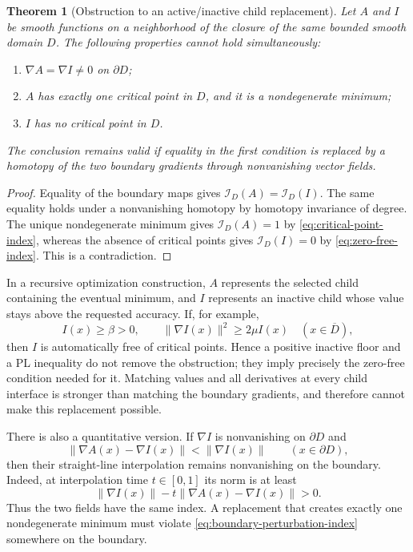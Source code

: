 \documentclass[11pt,a4paper]{article}
\newtheorem{theorem}{Theorem}[section]
\theoremstyle{definition}
\theoremstyle{remark}
\begin{document}
\begin{theorem}[Obstruction to an active/inactive child replacement]
\label{thm:common-boundary-child-obstruction}
Let $A$ and $I$ be smooth functions on a neighborhood of the closure of
the same bounded smooth domain $D$.  The following properties cannot
hold simultaneously:
\begin{enumerate}
\item $\nabla A=\nabla I\ne0$ on $\partial D$;
\item $A$ has exactly one critical point in $D$, and it is a
      nondegenerate minimum;
\item $I$ has no critical point in $D$.
\end{enumerate}
The conclusion remains valid if equality in the first condition is
replaced by a homotopy of the two boundary gradients through
nonvanishing vector fields.
\end{theorem}

\begin{proof}
Equality of the boundary maps gives
$\mathcal I_D(A)=\mathcal I_D(I)$.  The same equality holds under a
nonvanishing homotopy by homotopy invariance of degree.
The unique nondegenerate minimum gives
$\mathcal I_D(A)=1$ by \eqref{eq:critical-point-index}, whereas the
absence of critical points gives $\mathcal I_D(I)=0$ by
\eqref{eq:zero-free-index}.  This is a contradiction.
\end{proof}

In a recursive optimization construction, $A$ represents the selected
child containing the eventual minimum, and $I$ represents an inactive
child whose value stays above the requested accuracy.  If, for example,
\[
 I(x)\ge\beta>0,
 \qquad
 \|\nabla I(x)\|^2\ge2\mu I(x)
 \quad (x\in\overline D),
\]
then $I$ is automatically free of critical points.  Hence a positive
inactive floor and a PL inequality do not remove the obstruction; they
imply precisely the zero-free condition needed for it.  Matching values
and all derivatives at every child interface is stronger than matching
the boundary gradients, and therefore cannot make this replacement
possible.

There is also a quantitative version.  If $\nabla I$ is nonvanishing on
$\partial D$ and
\begin{equation}
 \|\nabla A(x)-\nabla I(x)\|<\|\nabla I(x)\|
 \qquad (x\in\partial D),
 \label{eq:boundary-perturbation-index}
\end{equation}
then their straight-line interpolation remains nonvanishing on the
boundary.  Indeed, at interpolation time $t\in[0,1]$ its norm is at
least
\[
 \|\nabla I(x)\|-t\|\nabla A(x)-\nabla I(x)\|>0.
\]
Thus the two fields have the same index.  A replacement that creates
exactly one nondegenerate minimum must violate
\eqref{eq:boundary-perturbation-index} somewhere on the boundary.
\end{document}
